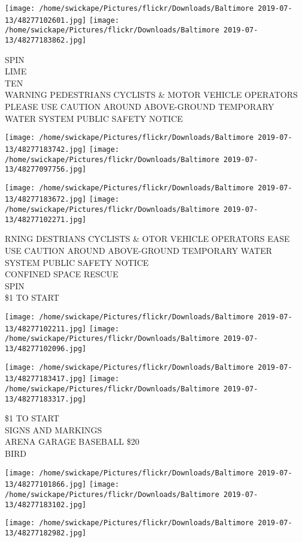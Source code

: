 \documentclass[10pt,letterpaper]{article}
\begin{document}
\texttt{[image: /home/swickape/Pictures/flickr/Downloads/Baltimore 2019-07-13/48277102601.jpg]}
\texttt{[image: /home/swickape/Pictures/flickr/Downloads/Baltimore 2019-07-13/48277183862.jpg]}

SPIN\\
LIME\\
TEN\\
WARNING PEDESTRIANS CYCLISTS \& MOTOR VEHICLE OPERATORS PLEASE USE CAUTION AROUND ABOVE{-}GROUND TEMPORARY WATER SYSTEM PUBLIC SAFETY NOTICE
\pagebreak

\texttt{[image: /home/swickape/Pictures/flickr/Downloads/Baltimore 2019-07-13/48277183742.jpg]}
\texttt{[image: /home/swickape/Pictures/flickr/Downloads/Baltimore 2019-07-13/48277097756.jpg]}

\texttt{[image: /home/swickape/Pictures/flickr/Downloads/Baltimore 2019-07-13/48277183672.jpg]}
\texttt{[image: /home/swickape/Pictures/flickr/Downloads/Baltimore 2019-07-13/48277102271.jpg]}

RNING DESTRIANS CYCLISTS \& OTOR VEHICLE OPERATORS EASE USE CAUTION AROUND ABOVE{-}GROUND TEMPORARY WATER SYSTEM PUBLIC SAFETY NOTICE\\
CONFINED SPACE RESCUE\\
SPIN\\
\$1 TO START
\pagebreak

\texttt{[image: /home/swickape/Pictures/flickr/Downloads/Baltimore 2019-07-13/48277102211.jpg]}
\texttt{[image: /home/swickape/Pictures/flickr/Downloads/Baltimore 2019-07-13/48277102096.jpg]}

\texttt{[image: /home/swickape/Pictures/flickr/Downloads/Baltimore 2019-07-13/48277183417.jpg]}
\texttt{[image: /home/swickape/Pictures/flickr/Downloads/Baltimore 2019-07-13/48277183317.jpg]}

\$1 TO START\\
SIGNS AND MARKINGS\\
ARENA GARAGE BASEBALL \$20\\
BIRD
\pagebreak

\texttt{[image: /home/swickape/Pictures/flickr/Downloads/Baltimore 2019-07-13/48277101866.jpg]}
\texttt{[image: /home/swickape/Pictures/flickr/Downloads/Baltimore 2019-07-13/48277183102.jpg]}

\vspace{0.25in}
\texttt{[image: /home/swickape/Pictures/flickr/Downloads/Baltimore 2019-07-13/48277182982.jpg]}
\end{document}
